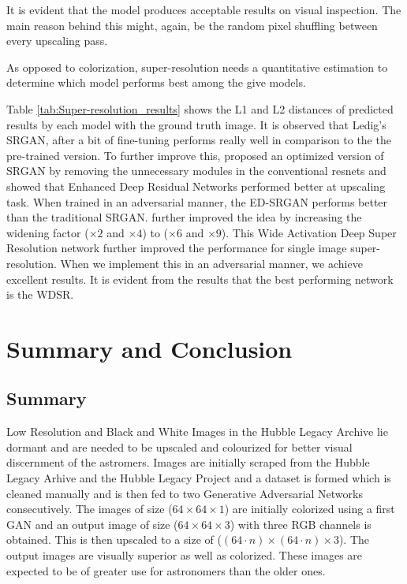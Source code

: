 \documentclass[oneside,a4paper,12pt]{report}
\begin{document}
It is evident that the model produces acceptable results on visual inspection. The main reason behind this might, again, be the random pixel shuffling between every upscaling pass. 

As opposed to colorization, super-resolution needs a quantitative estimation to determine which model performs best among the give models. 



\pagebreak
Table \ref{tab:Super-resolution_results} shows the L1 and L2 distances of predicted results by each model with the ground truth image. It is observed that Ledig's SRGAN, after a bit of fine-tuning performs really well in comparison to the the pre-trained version. To further improve this, \cite{lim2017enhanced} proposed an optimized version of SRGAN by removing the unnecessary modules in the conventional resnets and showed that Enhanced Deep Residual Networks performed better at upscaling task. When trained in an adversarial manner, the ED-SRGAN performs better than the traditional SRGAN. \cite{yu2018wide} further improved the idea by increasing the widening factor ($\times 2$ and $\times 4$) to ($\times 6$ and $\times 9$). This Wide Activation Deep Super Resolution network further improved the performance for single image super-resolution. When we implement this in an adversarial manner, we achieve excellent results. It is evident from the results that the best performing network is the WDSR.

\chapter{Summary and Conclusion}
\section{Summary}
\hspace*{0.25 in}Low Resolution and Black and White Images in the Hubble Legacy Archive lie dormant and are needed to be upscaled and colourized for better visual discernment of the astromers. Images are initially scraped from the Hubble Legacy Arhive and the Hubble Legacy Project and a dataset is formed which is cleaned manually and is then fed to two Generative Adversarial Networks consecutively. The images of size ($64\times 64\times 1$) are initially colorized using a first GAN and an output image of size ($64\times 64\times 3$) with three RGB channels is obtained. This is then upscaled to a size of ($(64\cdot n)\times (64\cdot n)\times 3$). The output images are visually superior as well as colorized. These images are expected to be of greater use for astronomers than the older ones. 
\end{document}

